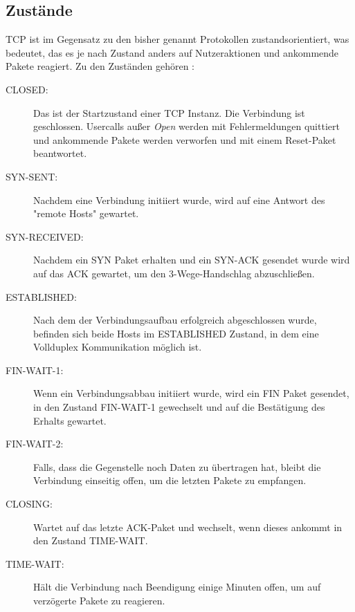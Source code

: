 \FloatBarrier
\subsection{Zustände}
TCP ist im Gegensatz zu den bisher genannt Protokollen zustandsorientiert, was bedeutet, das es je nach Zustand anders auf Nutzeraktionen und ankommende Pakete reagiert. 
Zu den Zuständen gehören :



\begin{description}

\item[CLOSED: ]Das ist der Startzustand einer TCP Instanz. Die Verbindung ist geschlossen. Usercalls außer \textit{Open} werden mit Fehlermeldungen quittiert und ankommende Pakete werden verworfen und mit einem Reset-Paket beantwortet.
\item[SYN-SENT: ]Nachdem eine Verbindung initiiert wurde, wird auf eine Antwort des {}"remote Hosts"{} gewartet. 
\item[SYN-RECEIVED: ] Nachdem ein SYN Paket erhalten und ein SYN-ACK gesendet wurde wird auf das ACK gewartet, um den 3-Wege-Handschlag abzuschließen. 
\item[ESTABLISHED: ] Nach dem der Verbindungsaufbau erfolgreich abgeschlossen wurde, befinden sich beide Hosts im ESTABLISHED Zustand, in dem eine Vollduplex Kommunikation möglich ist. 
\item[FIN-WAIT-1: ] Wenn ein Verbindungsabbau initiiert wurde, wird ein FIN Paket gesendet, in den Zustand FIN-WAIT-1 gewechselt und auf die Bestätigung des Erhalts gewartet. 
\item[FIN-WAIT-2: ] Falls, dass die Gegenstelle noch Daten zu übertragen hat, bleibt die Verbindung einseitig offen, um die letzten Pakete zu empfangen. 
\item[CLOSING: ]	Wartet auf das letzte ACK-Paket und wechselt, wenn dieses ankommt in den Zustand TIME-WAIT.
\item[TIME-WAIT: ] Hält die Verbindung nach Beendigung einige Minuten offen, um auf verzögerte Pakete zu reagieren.
\end{description}

